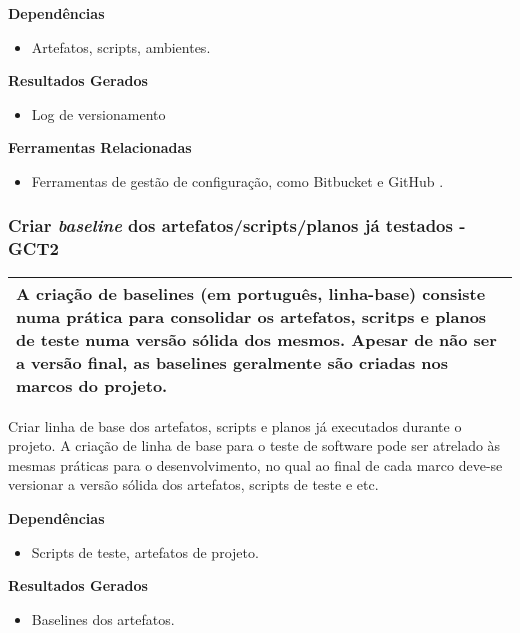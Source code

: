 \textbf{Dependências}
 \begin{itemize}
     \item Artefatos, scripts, ambientes.
\end{itemize}

\textbf{Resultados Gerados}
\begin{itemize}
    \item Log de versionamento
\end{itemize}

\textbf{Ferramentas Relacionadas }
\begin{itemize}
    \item Ferramentas de gestão de configuração, como Bitbucket \cite{Bitbucket} e GitHub \cite{GitHub}.
\end{itemize}

\subsubsection{Criar \textit{baseline} dos artefatos/scripts/planos já testados - GCT2 }
\label{sec:gct2}

\begin{table}[H]
\centering
\begin{tabular}{|p{130mm}|}
\hline
A criação de baselines (em português, linha-base) consiste numa prática para consolidar os artefatos, scritps e planos de teste numa versão sólida dos mesmos. Apesar de não ser a versão final, as baselines geralmente são criadas nos marcos do projeto. \\ 
\hline
\end{tabular}
\end{table}

Criar linha de base dos artefatos, scripts e planos já executados durante o projeto. A criação de linha de base para o teste de software pode ser atrelado às mesmas práticas para o desenvolvimento, no qual ao final de cada marco deve-se versionar a versão sólida dos artefatos, scripts de teste e etc.

\textbf{Dependências }
\begin{itemize}
    \item Scripts de teste, artefatos de projeto.
\end{itemize}

\textbf{Resultados Gerados}
 \begin{itemize}
     \item Baselines dos artefatos.
\end{itemize}

